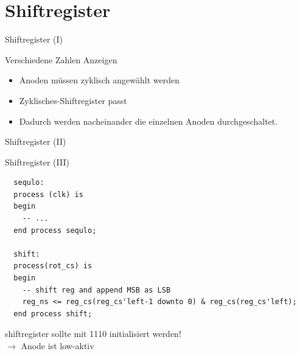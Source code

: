 
  \section{Shiftregister}
  \begin{frame} {Shiftregister (I)}
    \begin{block} {Verschiedene Zahlen Anzeigen}
      \begin{itemize}
        \item Anoden müssen zyklisch angewählt werden
        \item Zyklisches-Shiftregister passt
        \item Dadurch werden nacheinander die einzelnen Anoden durchgeschaltet.
      \end{itemize}
    \end{block}
  \end{frame}

  \begin{frame} [fragile] {Shiftregister (II)}
    \begin{center}
    \end{center}
  \end{frame}

  \begin{frame} [fragile] {Shiftregister (III)}
    \begin{lstlisting}
  sequlo:
  process (clk) is
  begin
    -- ...
  end process sequlo;

  shift:
  process(rot_cs) is 
  begin
    -- shift reg and append MSB as LSB
    reg_ns <= reg_cs(reg_cs'left-1 downto 0) & reg_cs(reg_cs'left);
  end process shift;
    \end{lstlisting}
    
    \begin{alertblock} {}
      shiftregister sollte mit \grqq{}1110\grqq{} initialisiert werden!\\
      $\rightarrow$ Anode ist low-aktiv
    \end{alertblock}
  \end{frame}

